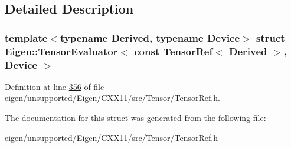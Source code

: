 \subsection{Detailed Description}
\subsubsection*{template$<$typename Derived, typename Device$>$\newline
struct Eigen\+::\+Tensor\+Evaluator$<$ const Tensor\+Ref$<$ Derived $>$, Device $>$}



Definition at line \hyperlink{eigen_2unsupported_2_eigen_2_c_x_x11_2src_2_tensor_2_tensor_ref_8h_source_l00356}{356} of file \hyperlink{eigen_2unsupported_2_eigen_2_c_x_x11_2src_2_tensor_2_tensor_ref_8h_source}{eigen/unsupported/\+Eigen/\+C\+X\+X11/src/\+Tensor/\+Tensor\+Ref.\+h}.



The documentation for this struct was generated from the following file\+:\begin{DoxyCompactItemize}
\item 
eigen/unsupported/\+Eigen/\+C\+X\+X11/src/\+Tensor/\+Tensor\+Ref.\+h\end{DoxyCompactItemize}
